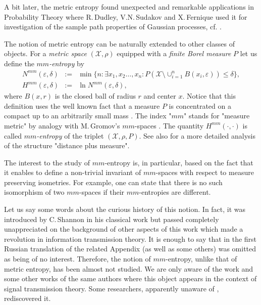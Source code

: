 \documentclass[12pt]{article}
\let\ep\varepsilon
\let\le\leqslant
\theoremstyle{definition}
\begin{document}
A bit later, the metric entropy found unexpected and remarkable applications in Probability Theory where R.\,Dudley, V.N.\,Sudakov and X.\,Fernique used it for investigation of the sample path properties of Gaussian processes, cf. \cite{Lifshits1, Lifshits2}.

The notion of metric entropy can be naturally extended to other classes of objects. For a {\it metric space} $(\mathcal{X},\rho)$ equipped with a {\it finite Borel measure} $P$  let us define the {\it $mm$-entropy} by
\begin{eqnarray*}
    N^{mm}(\ep, \delta) &:=& \min\{n: \exists x_1, x_2\dots, x_n: P(\mathcal{X}\setminus \cup_{i = 1}^n B(x_i, \ep)) \le \delta\},
\\
    H^{mm}(\ep,\delta) &:=& \ln N^{mm}(\ep, \delta),
\end{eqnarray*}
where $B(x, r)$ is the closed ball of radius $r$ and center $x$. Notice that this definition uses the well known fact
that a measure $P$  is concentrated on a compact up to an arbitrarily small mass \cite{Halmosh}. The index "$mm$" stands for "measure metric"  by analogy with M.\,Gromov's
$mm$-spaces \cite{Gromov}. The quantity $H^{mm}(\cdot, \cdot)$ is called \textit{$mm$-entropy} of the triplet $(\mathcal{X},\rho,P)$. See also \cite{VerVepZat} for a more detailed analysis of the structure "distance plus measure".

The interest to the study of $mm$-entropy is, in particular, based on the fact that it enables to define a non-trivial invariant of $mm$-spaces with respect to measure preserving isometries. For example, one can state that there is no such isomorphism of two $mm$-spaces if their $mm$-entropies are different.

Let us say some words about the curious history of this notion. In fact, it was introduced by C.\,Shannon in his classical work \cite[Appendix 7]{Shannon} but passed completely unappreciated on the background of other aspects of this work which made a revolution in information transmission theory. It is enough to say that in the first Russian translation of \cite{Shannon} the related Appendix (as well as some others) was omitted as being of no interest.
Therefore, the notion of $mm$-entropy, unlike that of metric entropy, has been almost not studied.
We are only aware of the work \cite{PinSof} and some other works of the same authors where this object appears in the context of signal transmission theory. Some researchers, apparently unaware of \cite{Shannon}, rediscovered it.
\end{document}

